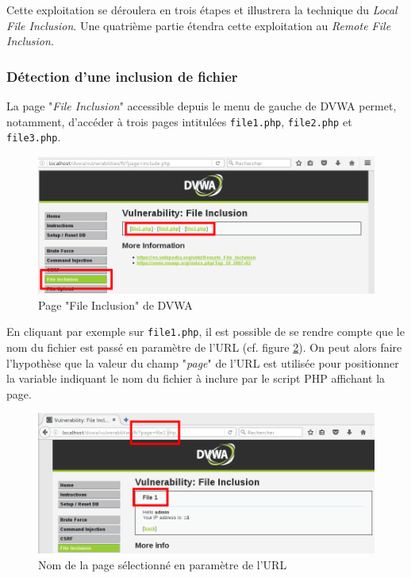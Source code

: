 Cette exploitation se déroulera en trois étapes et illustrera la technique du \textit{Local File Inclusion}. Une quatrième partie étendra cette exploitation au \textit{Remote File Inclusion}.

\subsubsection{Détection d'une inclusion de fichier}

La page "\textit{File Inclusion}" accessible depuis le menu de gauche de DVWA permet, notamment, d'accéder à trois pages intitulées \texttt{file1.php}, \texttt{file2.php} et \texttt{file3.php}. 

\begin{figure}[!h]
\begin{center}
\includegraphics[scale=.45]{images/fi1_1.png}

\caption{Page "File Inclusion" de DVWA}
\label{fi_dvwa1}
\end{center}
\end{figure}

En cliquant par exemple sur \texttt{file1.php}, il est possible de se rendre compte que le nom du fichier est passé en paramètre de l'URL (cf. figure \ref{fi_dvwa2}). On peut alors faire l'hypothèse que la valeur du champ "\textit{page}" de l'URL est utilisée pour positionner la variable indiquant le nom du fichier à inclure par le script PHP affichant la page. 

\begin{figure}[!h]
\begin{center}
\includegraphics[scale=.5]{images/fi2.png}

\caption{Nom de la page sélectionné en paramètre de l'URL}
\label{fi_dvwa2}
\end{center}
\end{figure}

